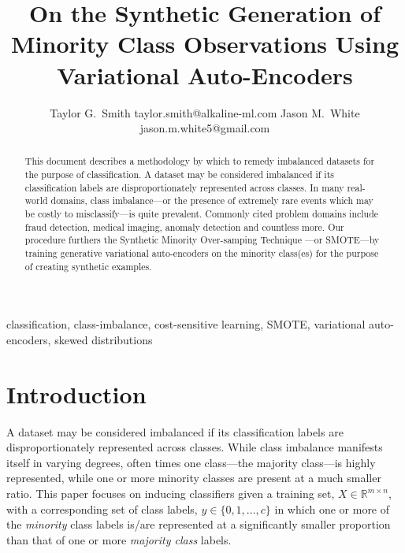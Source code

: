 \documentclass[twoside,11pt]{article}
\begin{document}
\title{On the Synthetic Generation of Minority Class Observations Using Variational Auto-Encoders}

\author{\name Taylor G.\ Smith \email taylor.smith@alkaline-ml.com
       \AND
       \name Jason M.\ White \email jason.m.white5@gmail.com}

\maketitle

\begin{abstract}%
This document describes a methodology by which to remedy imbalanced datasets for the purpose of classification. A dataset may be considered imbalanced if its classification labels are disproportionately represented across classes. In many real-world domains, class imbalance---or the presence of extremely rare events which may be costly to misclassify---is quite prevalent. Commonly cited problem domains include fraud detection, medical imaging, anomaly detection and countless more.  Our procedure furthers the Synthetic Minority Over-samping Technique \citep*{chawla2002smote}---or SMOTE---by training generative variational auto-encoders on the minority class(es) for the purpose of creating synthetic examples.
\end{abstract}

\begin{keywords}
  classification, class-imbalance, cost-sensitive learning, SMOTE, variational auto-encoders, skewed distributions
\end{keywords}

\section{Introduction}

A dataset may be considered imbalanced if its classification labels are disproportionately represented across classes. While class imbalance manifests itself in varying degrees, often times one class---the majority class---is highly represented, while one or more minority classes are present at a much smaller ratio. This paper focuses on inducing classifiers given a training set, $X \in \mathbb{R}^{m \times n}$, with a corresponding set of class labels, $y \in \{0, 1, ..., c\}$ in which one or more of the \emph{minority} class labels is/are represented at a significantly smaller proportion than that of one or more \emph{majority class} labels.
\end{document}
